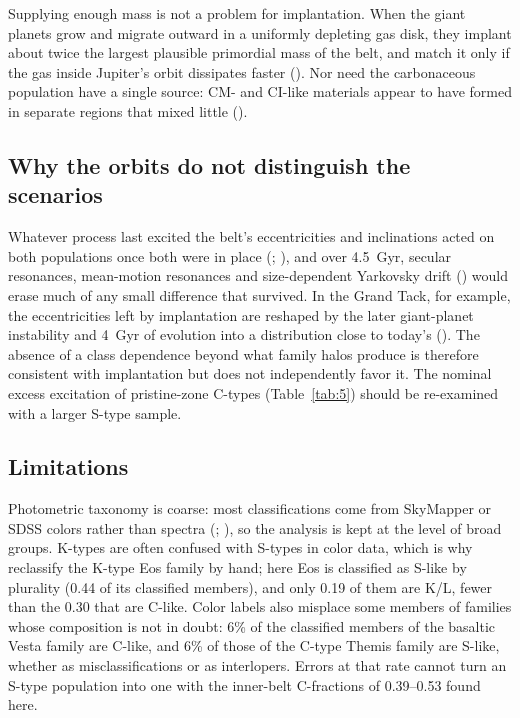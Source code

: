 \documentclass[twocolumn]{aastex701}
\begin{document}
Supplying enough mass is not a problem for implantation. When the giant planets grow and migrate outward in a uniformly depleting gas disk, they implant about twice the largest plausible primordial mass of the belt, and match it only if the gas inside Jupiter’s orbit dissipates faster (\citealt{takeichi2026}). Nor need the carbonaceous population have a single source: CM- and CI-like materials appear to have formed in separate regions that mixed little (\citealt{anderson2026}).

\subsection{Why the orbits do not distinguish the scenarios}\label{sec:5.4}
Whatever process last excited the belt’s eccentricities and inclinations acted on both populations once both were in place (\citealt{petit2001}; \citealt{morbidelli2015}), and over 4.5~Gyr, secular resonances, mean-motion resonances and size-dependent Yarkovsky drift (\citealt{bottke2006}) would erase much of any small difference that survived. In the Grand Tack, for example, the eccentricities left by implantation are reshaped by the later giant-planet instability and 4~Gyr of evolution into a distribution close to today’s (\citealt{deienno2016}). The absence of a class dependence beyond what family halos produce is therefore consistent with implantation but does not independently favor it. The nominal excess excitation of pristine-zone C-types (Table~\ref{tab:5}) should be re-examined with a larger S-type sample.

\subsection{Limitations}\label{sec:5.5}
Photometric taxonomy is coarse: most classifications come from SkyMapper or SDSS colors rather than spectra (\citealt{sergeyev2021}; \citealt{sergeyev2022}), so the analysis is kept at the level of broad groups. K-types are often confused with S-types in color data, which is why \citet{demeo2013} reclassify the K-type Eos family by hand; here Eos is classified as S-like by plurality (0.44 of its classified members), and only 0.19 of them are K/L, fewer than the 0.30 that are C-like. Color labels also misplace some members of families whose composition is not in doubt: 6\% of the classified members of the basaltic Vesta family are C-like, and 6\% of those of the C-type Themis family are S-like, whether as misclassifications or as interlopers. Errors at that rate cannot turn an S-type population into one with the inner-belt C-fractions of 0.39–0.53 found here.
\end{document}
